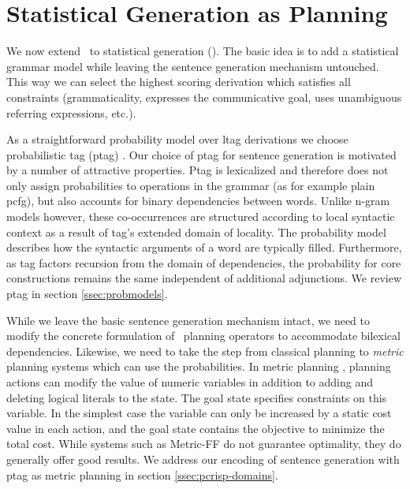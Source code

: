 \section{Statistical Generation as Planning}
\label{sec:pcrisp}

We now extend \crisp\ to statistical generation (\pcrisp). The basic idea is to add a statistical grammar model while leaving the sentence generation mechanism untouched. This way we can select the highest scoring derivation which satisfies all constraints (grammaticality, expresses the communicative goal, uses unambiguous referring expressions, etc.). 

 As a straightforward probability model over {\sc ltag} derivations we choose probabilistic {\sc tag} ({\sc ptag}) \cite{resnik1992}.
Our choice of {\sc ptag} for sentence generation is motivated by a number of attractive properties.
 {\sc Ptag} is lexicalized and therefore does not only assign probabilities to operations in the grammar (as for example plain {\sc pcfg}), but also accounts for binary dependencies between words.  Unlike n-gram models however, these co-occurrences are structured according to local syntactic context as a result of {\sc tag}'s extended domain of locality. The probability model describes how the syntactic arguments of a word are typically filled. 
Furthermore, as {\sc tag} factors recursion from the domain of dependencies, the probability for core constructions remains the same independent of additional adjunctions. 
 We review {\sc ptag} in section \ref{ssec:probmodels}.

While we leave the basic sentence generation mechanism intact, we need to modify the concrete formulation of \crisp\ planning operators to accommodate bilexical dependencies. Likewise, we need to take the step from classical planning to \emph{metric} planning systems which can use the probabilities.
In metric planning \cite{fox2002}, planning actions can modify the value of numeric variables in addition to adding and deleting logical literals to the state. The goal state specifies constraints on this variable. In the simplest case the variable can only be increased by a static cost value in each action, and the goal state contains the objective to minimize the total cost. While systems such as Metric-{\sc FF} \cite{hoffmann2003} do not guarantee optimality, they do generally offer good results. We address our encoding of sentence generation with {\sc ptag} as metric planning in section \ref{ssec:pcrisp-domains}. 


